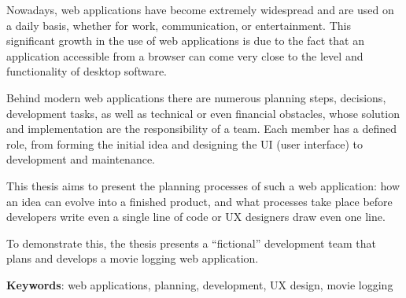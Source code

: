 Nowadays, web applications have become extremely widespread and are used on a daily basis, whether for work, communication, or entertainment. This significant growth in the use of web applications is due to the fact that an application accessible from a browser can come very close to the level and functionality of desktop software.

Behind modern web applications there are numerous planning steps, decisions, development tasks, as well as technical or even financial obstacles, whose solution and implementation are the responsibility of a team. Each member has a defined role, from forming the initial idea and designing the UI (user interface) to development and maintenance.

This thesis aims to present the planning processes of such a web application: how an idea can evolve into a finished product, and what processes take place before developers write even a single line of code or UX designers draw even one line.

To demonstrate this, the thesis presents a “fictional” development team that plans and develops a movie logging web application.

\textbf{Keywords}: web applications, planning, development, UX design, movie logging
